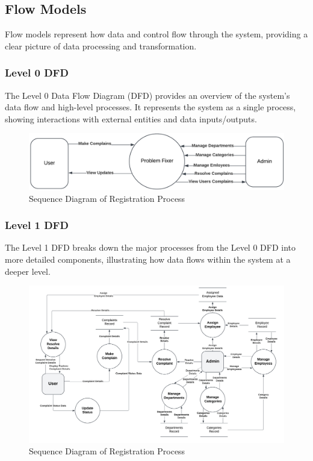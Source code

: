 \documentclass[a4paper,12pt]{article}
\begin{document}
\subsection{Flow Models}
Flow models represent how data and control flow through the system, providing a clear picture of data processing and transformation.

\subsubsection{Level 0 DFD}
The Level 0 Data Flow Diagram (DFD) provides an overview of the system’s data flow and high-level processes. It represents the system as a single process, showing interactions with external entities and data inputs/outputs.
\begin{figure}[H]
    \centering
    \includegraphics[width=1\linewidth]{photos/dfd-0.png}
    \caption{Sequence Diagram of Registration Process}
    \label{fig:enter-label}
\end{figure}

\subsubsection{Level 1 DFD}
The Level 1 DFD breaks down the major processes from the Level 0 DFD into more detailed components, illustrating how data flows within the system at a deeper level.
\begin{figure}[H]
    \centering
    \includegraphics[width=1\linewidth]{photos/dfd-1.png}
    \caption{Sequence Diagram of Registration Process}
    \label{fig:enter-label}
\end{figure}
\end{document}
